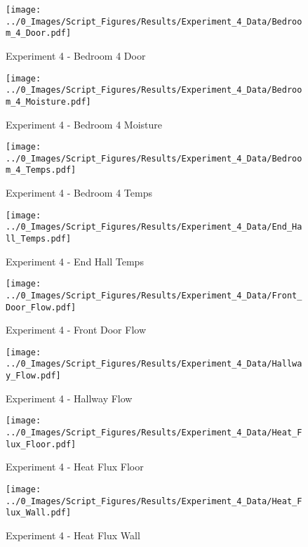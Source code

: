 	\begin{figure}[H]
		\centering
		\texttt{[image: ../0\_Images/Script\_Figures/Results/Experiment\_4\_Data/Bedroom\_4\_Door.pdf]}
		\caption[]{Experiment 4 - Bedroom 4 Door}
	\end{figure}
 
	\clearpage

	\begin{figure}[H]
		\centering
		\texttt{[image: ../0\_Images/Script\_Figures/Results/Experiment\_4\_Data/Bedroom\_4\_Moisture.pdf]}
		\caption[]{Experiment 4 - Bedroom 4 Moisture}
	\end{figure}
 

	\begin{figure}[H]
		\centering
		\texttt{[image: ../0\_Images/Script\_Figures/Results/Experiment\_4\_Data/Bedroom\_4\_Temps.pdf]}
		\caption[]{Experiment 4 - Bedroom 4 Temps}
	\end{figure}
 
	\clearpage

	\begin{figure}[H]
		\centering
		\texttt{[image: ../0\_Images/Script\_Figures/Results/Experiment\_4\_Data/End\_Hall\_Temps.pdf]}
		\caption[]{Experiment 4 - End Hall Temps}
	\end{figure}
 

	\begin{figure}[H]
		\centering
		\texttt{[image: ../0\_Images/Script\_Figures/Results/Experiment\_4\_Data/Front\_Door\_Flow.pdf]}
		\caption[]{Experiment 4 - Front Door Flow}
	\end{figure}
 
	\clearpage

	\begin{figure}[H]
		\centering
		\texttt{[image: ../0\_Images/Script\_Figures/Results/Experiment\_4\_Data/Hallway\_Flow.pdf]}
		\caption[]{Experiment 4 - Hallway Flow}
	\end{figure}
 

	\begin{figure}[H]
		\centering
		\texttt{[image: ../0\_Images/Script\_Figures/Results/Experiment\_4\_Data/Heat\_Flux\_Floor.pdf]}
		\caption[]{Experiment 4 - Heat Flux Floor}
	\end{figure}
 
	\clearpage

	\begin{figure}[H]
		\centering
		\texttt{[image: ../0\_Images/Script\_Figures/Results/Experiment\_4\_Data/Heat\_Flux\_Wall.pdf]}
		\caption[]{Experiment 4 - Heat Flux Wall}
	\end{figure}
 

